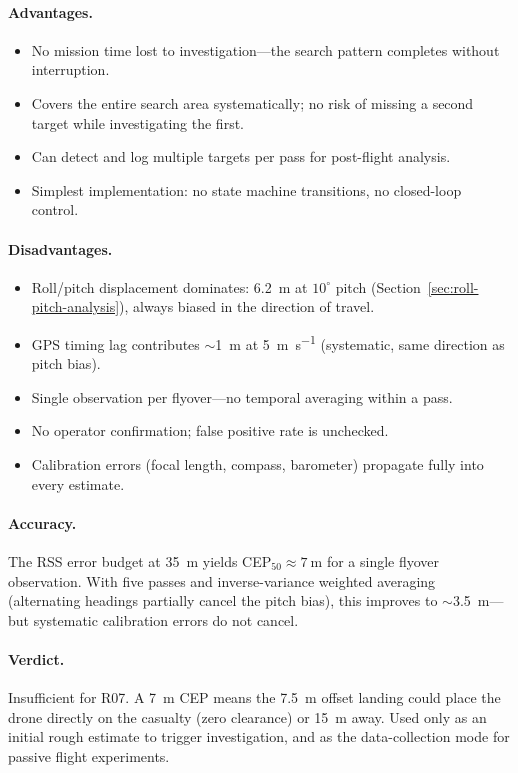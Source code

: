 \paragraph{Advantages.}
\begin{itemize}
  \item No mission time lost to investigation---the search pattern completes without interruption.
  \item Covers the entire search area systematically; no risk of missing a second target while investigating the first.
  \item Can detect and log multiple targets per pass for post-flight analysis.
  \item Simplest implementation: no state machine transitions, no closed-loop control.
\end{itemize}

\paragraph{Disadvantages.}
\begin{itemize}
  \item Roll/pitch displacement dominates: \SI{6.2}{\metre} at $10^{\circ}$ pitch (Section~\ref{sec:roll-pitch-analysis}), always biased in the direction of travel.
  \item GPS timing lag contributes $\sim$\SI{1}{\metre} at \SI{5}{\metre\per\second} (systematic, same direction as pitch bias).
  \item Single observation per flyover---no temporal averaging within a pass.
  \item No operator confirmation; false positive rate is unchecked.
  \item Calibration errors (focal length, compass, barometer) propagate fully into every estimate.
\end{itemize}

\paragraph{Accuracy.}  The RSS error budget at \SI{35}{\metre} yields CEP$_{50} \approx \SI{7}{\metre}$ for a single flyover observation.  With five passes and inverse-variance weighted averaging (alternating headings partially cancel the pitch bias), this improves to $\sim$\SI{3.5}{\metre}---but systematic calibration errors do not cancel.

\paragraph{Verdict.}  Insufficient for R07.  A \SI{7}{\metre} CEP means the \SI{7.5}{\metre} offset landing could place the drone directly on the casualty (zero clearance) or \SI{15}{\metre} away.  Used only as an initial rough estimate to trigger investigation, and as the data-collection mode for passive flight experiments.

